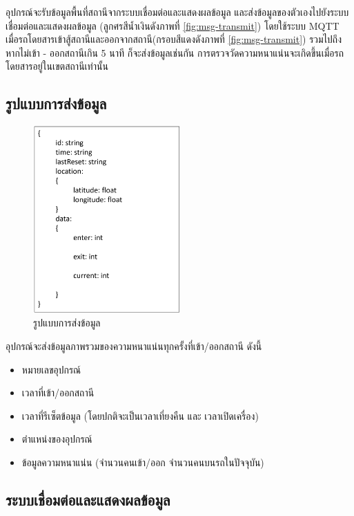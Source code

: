 อุปกรณ์จะรับข้อมูลพื้นที่สถานีจากระบบเชื่อมต่อและแสดงผลข้อมูล และส่งข้อมูลของตัวเองไปยังระบบเชื่อมต่อและแสดงผลข้อมูล (ลูกศรสีน้ำเงินดังภาพที่ \ref{fig:msg-transmit}) โดยใช้ระบบ MQTT เมื่อรถโดยสารเข้าสู้สถานีและออกจากสถานี(กรอบสีแดงดังภาพที่ \ref{fig:msg-transmit}) รวมไปถึงหากไม่เข้า - ออกสถานีเกิน 5 นาที ก็จะส่งข้อมูลเช่นกัน การตรวจวัดความหนาแน่นจะเกิดขึ้นเมื่อรถโดยสารอยู่ในเขตสถานีเท่านั้น

\subsection{รูปแบบการส่งข้อมูล}

\begin{figure}[h!]
  \begin{center}
    \includegraphics[width=0.5\textwidth]{data-schema.png}
  \end{center}
  \caption{รูปแบบการส่งข้อมูล}
  \label{fig:data-schema}
\end{figure}

อุปกรณ์จะส่งข้อมูลภาพรวมของความหนาแน่นทุกครั้งที่เข้า/ออกสถานี ดังนี้
\begin{itemize}
  \item หมายเลขอุปกรณ์
  \item เวลาที่เข้า/ออกสถานี
  \item เวลาที่รีเซ็ตข้อมูล (โดยปกติจะเป็นเวลาเที่ยงคืน และ เวลาเปิดเครื่อง)
  \item ตำแหน่งของอุปกรณ์
  \item ข้อมูลความหนาแน่น (จำนวนคนเข้า/ออก จำนวนคนบนรถในปัจจุบัน)
\end{itemize}

\subsection{ระบบเชื่อมต่อและแสดงผลข้อมูล}

